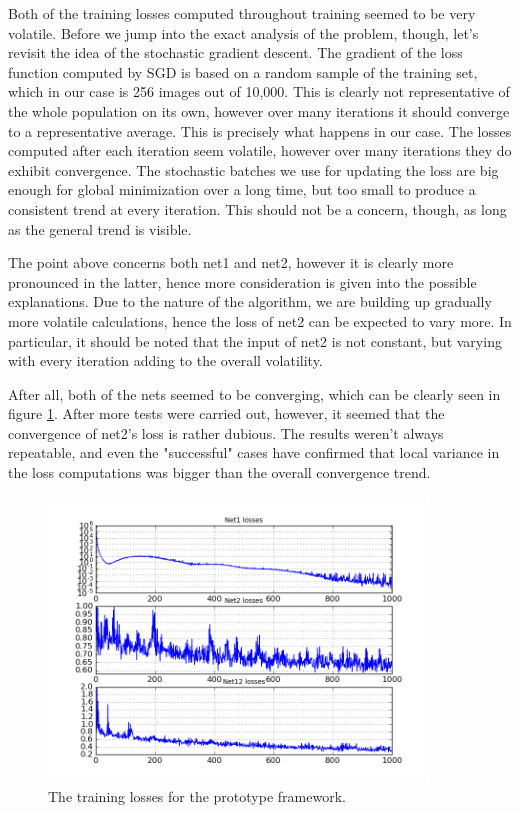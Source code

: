 \documentclass[a4paper, 11pt]{article}
\numberwithin{equation}{section}
\begin{document}
	Both of the training losses computed throughout training seemed to be very volatile. Before we jump into the exact analysis of the problem, though, let's revisit the idea of the stochastic gradient descent. The gradient of the loss function computed by SGD is based on a random sample of the training set, which in our case is 256 images out of 10,000. This is clearly not representative of the whole population on its own, however over many iterations it should converge to a representative average. This is precisely what happens in our case. The losses computed after each iteration seem volatile, however over many iterations they do exhibit convergence. The stochastic batches we use for updating the loss are big enough for global minimization over a long time, but too small to produce a consistent trend at every iteration. This should not be a concern, though, as long as the general trend is visible.
	
	The point above concerns both net1 and net2, however it is clearly more pronounced in the latter, hence more consideration is given into the possible explanations. Due to the nature of the algorithm, we are building up gradually more volatile calculations, hence the loss of net2 can be expected to vary more. In particular, it should be noted that the input of net2 is not constant, but varying with every iteration adding to the overall volatility.
	
	After all, both of the nets seemed to be converging, which can be clearly seen in figure \ref{fig:default_losses}. After more tests were carried out, however, it seemed that the convergence of net2's loss is rather dubious. The results weren't always repeatable, and even the "successful" cases have confirmed that local variance in the loss computations was bigger than the overall convergence trend.
	
	\begin{figure}[!h]
		\centering
		\includegraphics[page=1,width=0.9\textwidth]{losses.png}
		\caption{\label{fig:default_losses}{The training losses for the prototype framework.}}
	\end{figure}
	
\end{document}
